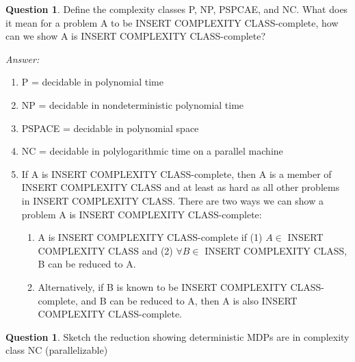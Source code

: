 \documentclass{article}
\theoremstyle{definition}
\newtheorem{question}[thm]{Question}
\newenvironment{answer}{\noindent\textit{Answer:}}{}
\begin{document}
\begin{question}
    Define the complexity classes P, NP, PSPCAE, and NC. What does it mean for a problem A to be INSERT COMPLEXITY CLASS-complete, how can we show A is INSERT COMPLEXITY CLASS-complete?
\end{question}

\begin{answer}
    \begin{enumerate}
        \item P = decidable in polynomial time
        \item NP = decidable in nondeterministic polynomial time
        \item PSPACE = decidable in polynomial space
        \item NC = decidable in polylogarithmic time on a parallel machine
        \item If A is INSERT COMPLEXITY CLASS-complete, then A is a member of INSERT COMPLEXITY CLASS and at least as hard as all other problems in INSERT COMPLEXITY CLASS. There are two ways we can show a problem A is INSERT COMPLEXITY CLASS-complete:
        \begin{enumerate}
            \item A is INSERT COMPLEXITY CLASS-complete if (1) $A \in$ INSERT COMPLEXITY CLASS and (2) $\forall B \in$ INSERT COMPLEXITY CLASS, B can be reduced to A.
            \item Alternatively, if B is known to be INSERT COMPLEXITY CLASS-complete, and B can be reduced to A, then A is also INSERT COMPLEXITY CLASS-complete.
        \end{enumerate}
    \end{enumerate}
\end{answer}

\begin{question}
Sketch the reduction showing deterministic MDPs are in complexity class NC (parallelizable)
\end{question}
\end{document}
